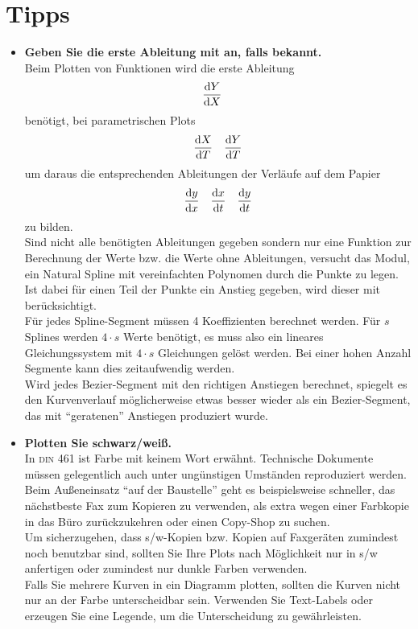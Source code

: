\documentclass[ngerman,origlongtable]{scrartcl}
\begin{document}
\section{Tipps}
\begin{itemize}
\item	\textbf{Geben Sie die erste Ableitung mit an, falls bekannt.}\\
Beim Plotten von Funktionen wird die erste Ableitung
\begin{align*}\frac{\mathrm{d} Y}{\mathrm{d} X}&\end{align*}
benötigt, bei parametrischen Plots
\begin{align*}\frac{\mathrm{d} X}{\mathrm{d} T}&&\frac{\mathrm{d} Y}{\mathrm{d} T}\end{align*}
um daraus die entsprechenden Ableitungen der Verläufe auf dem Papier
\begin{align*}\frac{\mathrm{d} y}{\mathrm{d} x}&&\frac{\mathrm{d} x}{\mathrm{d} t}&&\frac{\mathrm{d} y}{\mathrm{d} t}\end{align*}
zu bilden.\\
Sind nicht alle benötigten Ableitungen gegeben sondern nur eine Funktion
zur Berechnung der Werte bzw. die Werte ohne Ableitungen, versucht das Modul,
ein Natural Spline mit vereinfachten Polynomen durch die Punkte zu legen.
Ist dabei für einen Teil der Punkte ein Anstieg gegeben, wird dieser mit
berücksichtigt.\\
Für jedes Spline-Segment müssen 4 Koeffizienten berechnet werden. Für \(s\)
Splines werden \(4\cdot{}s\) Werte benötigt, es muss also ein lineares
Gleichungssystem mit \(4\cdot{}s\) Gleichungen gelöst werden. Bei einer hohen
Anzahl Segmente kann dies zeitaufwendig werden.\\
Wird jedes Bezier-Segment mit den richtigen Anstiegen berechnet, spiegelt es
den Kurvenverlauf möglicherweise etwas besser wieder als ein Bezier-Segment,
das mit "`geratenen"' Anstiegen produziert wurde.
\item	\textbf{Plotten Sie schwarz/weiß.}\\
In \textsc{din} 461 ist Farbe mit keinem Wort erwähnt.
Technische Dokumente müssen gelegentlich auch unter ungünstigen Umständen
reproduziert werden. Beim Außeneinsatz "`auf der Baustelle"' geht es 
beispielsweise schneller, das nächstbeste Fax zum Kopieren zu verwenden,
als extra wegen einer Farbkopie in das Büro zurückzukehren oder einen
Copy-Shop zu suchen.\\
Um sicherzugehen, dass s/w-Kopien bzw. Kopien auf Faxgeräten zumindest
noch benutzbar sind, sollten Sie Ihre Plots nach Möglichkeit nur in
s/w anfertigen oder zumindest nur dunkle Farben verwenden.\\
Falls Sie mehrere Kurven in ein Diagramm plotten, sollten die Kurven
nicht nur an der Farbe unterscheidbar sein. Verwenden Sie Text-Labels
oder erzeugen Sie eine Legende, um die Unterscheidung
zu gewährleisten.
\end{itemize}
\clearpage
\end{document}
